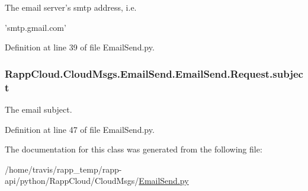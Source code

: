 The email server's smtp address, i.\-e. 

'smtp.\-gmail.\-com' 

Definition at line 39 of file Email\-Send.\-py.

\hypertarget{classRappCloud_1_1CloudMsgs_1_1EmailSend_1_1EmailSend_1_1Request_aab66642bb7ce90b5338434726cd5ec95}{
\subsubsection[{subject}]{\setlength{\rightskip}{0pt plus 5cm}Rapp\-Cloud.\-Cloud\-Msgs.\-Email\-Send.\-Email\-Send.\-Request.\-subject}}\label{classRappCloud_1_1CloudMsgs_1_1EmailSend_1_1EmailSend_1_1Request_aab66642bb7ce90b5338434726cd5ec95}


The email subject. 



Definition at line 47 of file Email\-Send.\-py.



The documentation for this class was generated from the following file\-:\begin{DoxyCompactItemize}
\item 
/home/travis/rapp\-\_\-temp/rapp-\/api/python/\-Rapp\-Cloud/\-Cloud\-Msgs/\hyperlink{EmailSend_8py}{Email\-Send.\-py}\end{DoxyCompactItemize}
